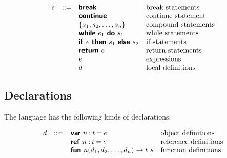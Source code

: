 \documentclass[11pt]{article}
\newcommand{\mathsc}[1]{\bm{\mathsf{#1}}}
\newcommand{\typebool}{\ensuremath{\mathsc{bool}}\xspace}
\newcommand{\exprtrue}{\mathsc{true}}
\newcommand{\exprfalse}{\mathsc{false}}
\newcommand{\stmtbreak}{\ensuremath{\mathsc{break}}\xspace}
\newcommand{\stmtcont}{\ensuremath{\mathsc{continue}}\xspace}
\newcommand{\stmtblock}[1]{\ensuremath{\{#1\}}\xspace}
\newcommand{\stmtwhile}[2]{\ensuremath{%
  \mathsc{while}~#1~\mathsc{do}~#2%
  }\xspace}
\newcommand{\stmtif}[3]{\ensuremath{%
  \mathsc{if}~#1~\mathsc{then}~#2~\mathsc{else}~#3%
  }\xspace}
\newcommand{\stmtret}[1]{\ensuremath{%
  \mathsc{return}~#1%
  }\xspace}
\newcommand{\stmtexpr}[1]{\ensuremath{#1}\xspace}
\newcommand{\stmtdecl}[1]{\ensuremath{#1}\xspace}
\newcommand{\decllet}[4]{\ensuremath{%
  \mathsc{#1}~#2\mathbin{:}#3\mathbin{=}#4%
  }\xspace}
\newcommand{\declvar}[3]{\decllet{var}{#1}{#2}{#3}}
\newcommand{\declref}[3]{\decllet{ref}{#1}{#2}{#3}}
\newcommand{\declfn}[4]{\ensuremath{%
  \mathsc{fun}~#1(#2) \rightarrow #3~#4%
  }\xspace}
\begin{document}
\[
\begin{array}{lcll}
s &::=& \stmtbreak              & \text{break statements} \\
  &   & \stmtcont               & \text{continue statement} \\
  &   & \stmtblock{s_1, s_2, \ldots, s_n}
                                & \text{compound statements} \\
  &   & \stmtwhile{e_1}{s_1}    & \text{while statements} \\
  &   & \stmtif{e}{s_1}{s_2}    & \text{if statements} \\
  &   & \stmtret{e}             & \text{return statements} \\
  &   & \stmtexpr{e}            & \text{expressions} \\
  &   & \stmtdecl{d}            & \text{local definitions} \\
\end{array}
\]

\subsection{Declarations}

The language has the following kinds of declarations:

\[
\begin{array}{lcll}
d &::=& \declvar{n}{t}{e}       & \text{object definitions} \\
  &   & \declref{n}{t}{e}       & \text{reference definitions} \\
  &   & \declfn{n}{d_1, d_2, \ldots, d_n}{t}{s}
                                & \text{function definitions} \\
\end{array}
\]





\end{document}
